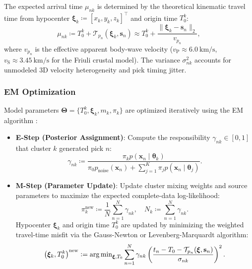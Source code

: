 The expected arrival time $\mu_{nk}$ is determined by the
theoretical kinematic travel time from hypocenter
$\boldsymbol{\xi}_k \coloneqq [x_k, y_k, z_k]^\top$ and origin time $T_0^k$:
\begin{equation}
  \mu_{nk} \coloneqq T_0^k + \mathcal{T}_{p_n}\left(\boldsymbol{\xi}_k,
  \mathbf{s}_n\right) \approx T_0^k + \frac{\|\boldsymbol{\xi}_k -
  \mathbf{s}_n\|_2}{v_{p_n}},
\end{equation}
where $v_{p_n}$ is the effective apparent body-wave velocity
($v_{\mathrm{P}} \approx \qty{6.0}{\kilo\meter\per\second}$, $v_{\mathrm{S}}
\approx \qty{3.45}{\kilo\meter\per\second}$ for the Friuli crustal model). The
variance $\sigma_{nk}^2$ accounts for unmodeled 3D velocity
heterogeneity and pick timing jitter.

\subsubsection{\acs{EM} Optimization}
Model parameters $\mathbf{\Theta} = \{T_0^k, \boldsymbol{\xi}_k,
m_k, \pi_k\}$ are optimized iteratively using the
\ac{EM} algorithm \parencite{bishop2006pattern}:
\begin{itemize}
  \item \textbf{E-Step (Posterior Assignment)}: Compute the
    responsibility $\gamma_{nk} \in [0, 1]$ that cluster $k$
    generated pick $n$:
    \begin{equation}
      \gamma_{nk} \coloneqq \frac{\pi_k p(\mathbf{x}_n \mid
      \boldsymbol{\theta}_k)}{\pi_0 p_{\mathrm{noise}}(\mathbf{x}_n)
      + \sum_{j = 1}^K \pi_j p(\mathbf{x}_n \mid \boldsymbol{\theta}_j)}.
    \end{equation}
  \item \textbf{M-Step (Parameter Update)}: Update cluster mixing
    weights and source parameters to maximize the expected
    complete-data log-likelihood:
    \begin{equation}
      \pi_k^{\mathrm{new}} \coloneqq \frac{1}{N} \sum_{n = 1}^N \gamma_{nk},
      \quad N_k \coloneqq \sum_{n = 1}^N \gamma_{nk}.
    \end{equation}
    Hypocenter $\boldsymbol{\xi}_k$ and origin time $T_0^k$ are
    updated by minimizing the weighted travel-time misfit via the
    Gauss-Newton or Levenberg-Marquardt algorithm:
    \begin{equation}
      \left(\boldsymbol{\xi}_k, T_0^k\right)^{\mathrm{new}} \mathrel{\mathop:}=
      \operatorname{arg\,min}_{\boldsymbol{\xi}, T_0} \sum_{n = 1}^N \gamma_{nk}
      \left( \frac{t_n - T_0 - \mathcal{T}_{p_n}(\boldsymbol{\xi},
      \mathbf{s}_n)}{\sigma_{nk}} \right)^2.
    \end{equation}
\end{itemize}

